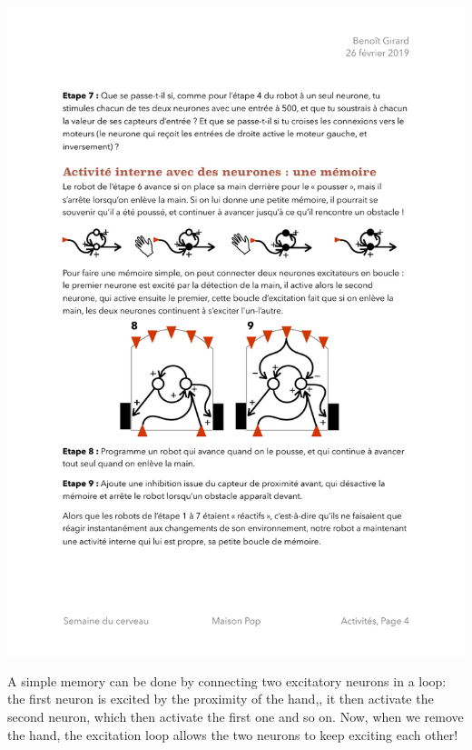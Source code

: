\documentclass[12pt]{article}
\begin{document}
\begin{center}
\includegraphics[width=\textwidth]{../Memoire.pdf}
\end{center}


A simple memory can be done by connecting two excitatory neurons in a loop: the first neuron is excited by the proximity of the hand,, it then activate the second neuron, which then activate the first one and so on. Now, when we remove the hand, the excitation loop allows the two neurons to keep exciting each other!
\end{document}
